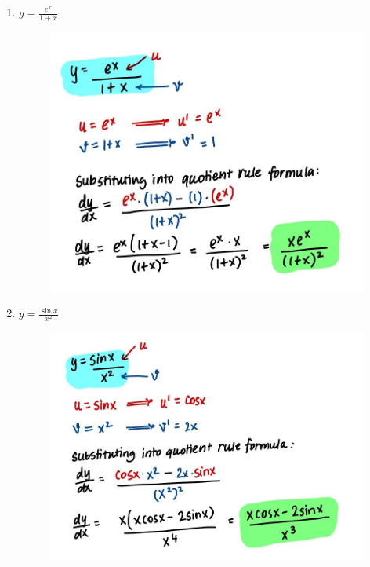 \documentclass{article}
\begin{document}
\begin{enumerate}
    \item $y = \frac{e^x}{1+x}$
    \begin{figure}[H]
        \centering
        \includegraphics[width= 0.7\linewidth]{Q2.3.jpg}
        \label{fig:Q2.3}
    \end{figure}
    \item $y = \frac{\sin x}{x^2}$
    \begin{figure}[H]
        \centering
        \includegraphics[width= 0.7\linewidth]{Q2.4.jpg}
        \label{fig:Q2.4}
    \end{figure}
\end{enumerate}
\end{document}
